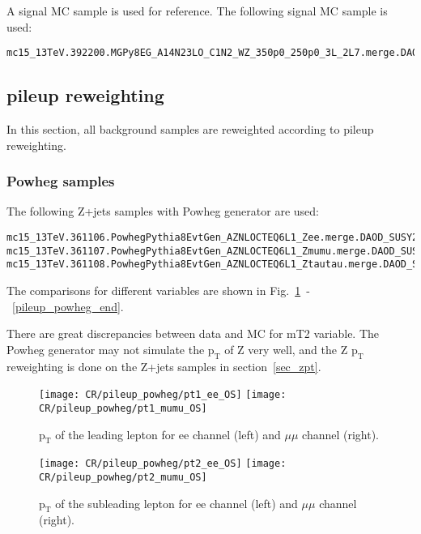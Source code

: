 A signal MC sample is used for reference.
The following signal MC sample is used:
\scriptsize
\begin{verbatim}
mc15_13TeV.392200.MGPy8EG_A14N23LO_C1N2_WZ_350p0_250p0_3L_2L7.merge.DAOD_SUSY2.e4287_a766_a777_r6282_p2419/
\end{verbatim}
\normalsize

\subsection{pileup reweighting}
In this section, all background samples are reweighted according to pileup reweighting.
\subsubsection{Powheg samples}
The following Z+jets samples with Powheg generator are used:
\scriptsize
\begin{verbatim}
mc15_13TeV.361106.PowhegPythia8EvtGen_AZNLOCTEQ6L1_Zee.merge.DAOD_SUSY2.e3601_s2576_s2132_r6765_r6282_p2419/
mc15_13TeV.361107.PowhegPythia8EvtGen_AZNLOCTEQ6L1_Zmumu.merge.DAOD_SUSY2.e3601_s2576_s2132_r6765_r6282_p2419/
mc15_13TeV.361108.PowhegPythia8EvtGen_AZNLOCTEQ6L1_Ztautau.merge.DAOD_SUSY2.e3601_s2576_s2132_r6765_r6282_p2419/
\end{verbatim}
\normalsize

The comparisons for different variables are shown in Fig.~\ref{pileup_powheg_start}~-~\ref{pileup_powheg_end}.

There are great discrepancies between data and MC for mT2 variable.
The Powheg generator may not simulate the $\text{p}_{\text{T}}$ of Z very well, and the Z $\text{p}_{\text{T}}$ reweighting is done on the Z+jets samples in section~\ref{sec_zpt}.

\begin{figure}
\texttt{[image: CR/pileup\_powheg/pt1\_ee\_OS]}
\texttt{[image: CR/pileup\_powheg/pt1\_mumu\_OS]}
\caption{$\text{p}_{\text{T}}$ of the leading lepton for ee channel (left) and $\mu\mu$ channel (right).}
\label{pileup_powheg_start}
\end{figure}

\begin{figure}
\texttt{[image: CR/pileup\_powheg/pt2\_ee\_OS]}
\texttt{[image: CR/pileup\_powheg/pt2\_mumu\_OS]}
\caption{$\text{p}_{\text{T}}$ of the subleading lepton for ee channel (left) and $\mu\mu$ channel (right).}
\end{figure}

